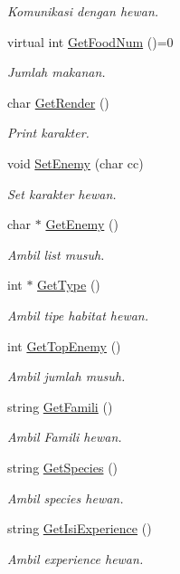 \begin{DoxyCompactItemize}
\begin{DoxyCompactList}\small\item\em Komunikasi dengan hewan. \end{DoxyCompactList}\item 
virtual int \hyperlink{class_animal_a9fdf4c4a5edd1265d9e0652127face39}{Get\+Food\+Num} ()=0
\begin{DoxyCompactList}\small\item\em Jumlah makanan. \end{DoxyCompactList}\item 
char \hyperlink{class_animal_a2573e109ec7241db7ed3eeb6363ee971}{Get\+Render} ()
\begin{DoxyCompactList}\small\item\em Print karakter. \end{DoxyCompactList}\item 
void \hyperlink{class_animal_a789dd4cdf9e115c253df5adf05656241}{Set\+Enemy} (char cc)
\begin{DoxyCompactList}\small\item\em Set karakter hewan. \end{DoxyCompactList}\item 
char $\ast$ \hyperlink{class_animal_a45be2a7ee0c91ad17626099acbd0a85d}{Get\+Enemy} ()
\begin{DoxyCompactList}\small\item\em Ambil list musuh. \end{DoxyCompactList}\item 
int $\ast$ \hyperlink{class_animal_aac38d92abcd76ecffa89eccffe76cdb6}{Get\+Type} ()
\begin{DoxyCompactList}\small\item\em Ambil tipe habitat hewan. \end{DoxyCompactList}\item 
int \hyperlink{class_animal_a9e9d7dece1f0f24eed4d51ef91b719ae}{Get\+Top\+Enemy} ()
\begin{DoxyCompactList}\small\item\em Ambil jumlah musuh. \end{DoxyCompactList}\item 
string \hyperlink{class_animal_a1a1ad83743b03fbe705721fa9dc23368}{Get\+Famili} ()
\begin{DoxyCompactList}\small\item\em Ambil Famili hewan. \end{DoxyCompactList}\item 
string \hyperlink{class_animal_ab96e4572871fa54d98cf639c6331ea90}{Get\+Species} ()
\begin{DoxyCompactList}\small\item\em Ambil species hewan. \end{DoxyCompactList}\item 
string \hyperlink{class_animal_a0f991dc05752ee65315e29ca3a1b5b11}{Get\+Isi\+Experience} ()
\begin{DoxyCompactList}\small\item\em Ambil experience hewan. \end{DoxyCompactList}\end{DoxyCompactItemize}
